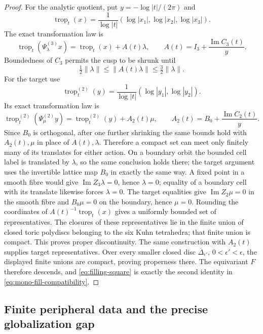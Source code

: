 \documentclass[11pt]{article}
\theoremstyle{definition}
\begin{document}
\begin{proof}
For the analytic quotient, put
$y=-\log|t|/(2\pi)$ and
\[
 \operatorname{trop}_t(x)=\frac{1}{\log|t|}
       (\log|x_1|,\log|x_2|,\log|x_3|).
\]
The exact transformation law is
\[
 \operatorname{trop}_t(\Psi^{(3)}_\lambda x)
 =\operatorname{trop}_t(x)+A(t)\lambda,\qquad
 A(t)=I_3+\frac{\operatorname{Im}C_3(t)}{y}.
\]
Boundedness of $C_3$ permits the cusp to be shrunk until
\[
\tfrac12\|\lambda\|\le\|A(t)\lambda\|
 \le\tfrac32\|\lambda\|.
\]
For the target use
\[
 \operatorname{trop}^{(2)}_t(y)
 =\frac{1}{\log|t|}(\log|y_1|,\log|y_2|).
\]
Its exact transformation law is
\[
 \operatorname{trop}^{(2)}_t(\Psi^{(2)}_\mu y)
 =\operatorname{trop}^{(2)}_t(y)+A_2(t)\mu,
 \qquad A_2(t)=B_0+\frac{\operatorname{Im}C_2(t)}{y}.
\]
Since $B_0$ is orthogonal, after one further shrinking the same bounds hold
with $A_2(t),\mu$ in place of $A(t),\lambda$.  Therefore a compact set can
meet only finitely many of its translates for either action.
On a boundary orbit the bounded cell label is translated by $\lambda$, so
the same conclusion holds there; the target argument uses the invertible
lattice map $B_0$ in exactly the same way.  A fixed point in a smooth fibre would
give $\operatorname{Im}Z_3\lambda=0$, hence $\lambda=0$; equality of a
boundary cell with its translate likewise forces $\lambda=0$.  The target
equalities give $\operatorname{Im}Z_2\mu=0$ in the smooth fibre and
$B_0\mu=0$ on the boundary, hence $\mu=0$.  Rounding
the coordinates of $A(t)^{-1}\operatorname{trop}_t(x)$ gives a uniformly
 bounded set of representatives.  The closures of these representatives lie
 in the finite union of closed toric polydiscs belonging to the six Kuhn
 tetrahedra; that finite union is compact.  This proves proper
discontinuity.  The same construction with $A_2(t)$ supplies target
representatives.  Over every smaller closed disc
$\overline\Delta_{\epsilon'}$, $0<\epsilon'<\epsilon$, the displayed
finite unions are compact, proving properness there.  The equivariant $F$
therefore descends, and
\eqref{eq:filling-square} is exactly the second identity in
\eqref{eq:mono-fill-compatibility}.
\end{proof}

\subsection{Finite peripheral data and the precise globalization gap}
\end{document}
